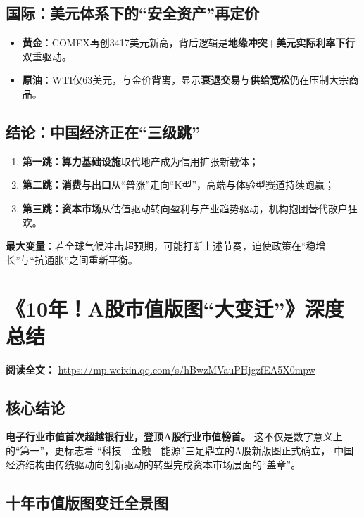 \subsection{国际：美元体系下的“安全资产”再定价}
\begin{itemize}
  \item \textbf{黄金}：COMEX再创3417美元新高，背后逻辑是\textbf{地缘冲突+美元实际利率下行}双重驱动。
  \item \textbf{原油}：WTI仅63美元，与金价背离，显示\textbf{衰退交易}与\textbf{供给宽松}仍在压制大宗商品。
\end{itemize}

\subsection{结论：中国经济正在“三级跳”}
\begin{enumerate}
  \item \textbf{第一跳：算力基础设施}取代地产成为信用扩张新载体；
  \item \textbf{第二跳：消费与出口}从“普涨”走向“K型”，高端与体验型赛道持续跑赢；
  \item \textbf{第三跳：资本市场}从估值驱动转向盈利与产业趋势驱动，机构抱团替代散户狂欢。
\end{enumerate}
\textbf{最大变量}：若全球气候冲击超预期，可能打断上述节奏，迫使政策在“稳增长”与“抗通胀”之间重新平衡。



\section{《10年！A股市值版图“大变迁”》深度总结}
\vspace{1cm}
\noindent\textbf{阅读全文：} \url{https://mp.weixin.qq.com/s/hBwzMVauPHjgzfEA5X0mpw}

\subsection{核心结论}
\textbf{电子行业市值首次超越银行业，登顶A股行业市值榜首。}  
这不仅是数字意义上的“第一”，更标志着  
“科技—金融—能源”三足鼎立的A股新版图正式确立，  
中国经济结构由传统驱动向创新驱动的转型完成资本市场层面的“盖章”。

\subsection{十年市值版图变迁全景图}

